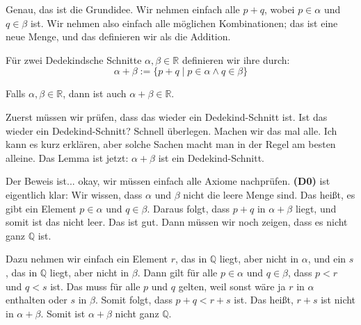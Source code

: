 \begin{student-interaction}
Genau, das ist die Grundidee. Wir nehmen einfach alle $p + q$, wobei $p \in \alpha$ und $q \in \beta$ ist. Wir nehmen also einfach alle möglichen Kombinationen; das ist eine neue Menge, und das definieren wir als die Addition.
\end{student-interaction}

\begin{math-stroke}
\begin{definition}[Addition]\label{def:addition-cuts}
Für zwei Dedekindsche Schnitte $\alpha, \beta \in \mathbb{R}$ definieren wir ihre  durch:
\begin{equation}
\label{eq:addition-def}
\alpha + \beta := \{ p + q \mid p \in \alpha \land q \in \beta \}
\end{equation}
\end{definition}

\begin{lemma}\label{lem:addition-well-defined}
Falls $\alpha, \beta \in \mathbb{R}$, dann ist auch $\alpha + \beta \in \mathbb{R}$.
\end{lemma}
\end{math-stroke}

\begin{spoken-clean}[00:53:12 - 00:55:29]
Zuerst müssen wir prüfen, dass das wieder ein Dedekind-Schnitt ist. Ist das wieder ein Dedekind-Schnitt? Schnell überlegen. Machen wir das mal alle. Ich kann es kurz erklären, aber solche Sachen macht man in der Regel am besten alleine. Das Lemma ist jetzt: $\alpha + \beta$ ist ein Dedekind-Schnitt.

Der Beweis ist... okay, wir müssen einfach alle Axiome nachprüfen. \textbf{(D0)} ist eigentlich klar: Wir wissen, dass $\alpha$ und $\beta$ nicht die leere Menge sind. Das heißt, es gibt ein Element $p \in \alpha$ und $q \in \beta$. Daraus folgt, dass $p + q$ in $\alpha + \beta$ liegt, und somit ist das nicht leer. Das ist gut. Dann müssen wir noch zeigen, dass es nicht ganz $\mathbb{Q}$ ist.

Dazu nehmen wir einfach ein Element $r$, das in $\mathbb{Q}$ liegt, aber nicht in $\alpha$, und ein $s$, das in $\mathbb{Q}$ liegt, aber nicht in $\beta$. Dann gilt für alle $p \in \alpha$ und $q \in \beta$, dass $p < r$ und $q < s$ ist. Das muss für alle $p$ und $q$ gelten, weil sonst wäre ja $r$ in $\alpha$ enthalten oder $s$ in $\beta$. Somit folgt, dass $p + q < r + s$ ist. Das heißt, $r + s$ ist nicht in $\alpha + \beta$. Somit ist $\alpha + \beta$ nicht ganz $\mathbb{Q}$.
\end{spoken-clean}

